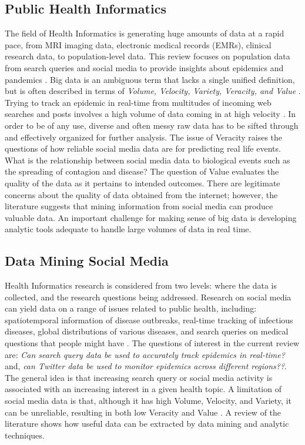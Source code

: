 \documentclass[sigconf]{acmart}
\begin{document}
\subsection{Public Health Informatics}

The field of Health Informatics is generating huge amounts of data at a rapid pace,
from MRI imaging data, electronic medical records (EMRs), clinical research data, to
population-level data. This review focuses on population data from search queries and 
social media to provide insights about epidemics and pandemics \cite{hay13, herland14}. 
Big data is an ambiguous term that lacks a single unified definition, but is often 
described in terms of {\it Volume, Velocity, Variety, Veracity, and Value}
\cite{demchenko12}. Trying to track an epidemic in real-time from multitudes of 
incoming web searches and posts involves a high volume of data coming in at high 
velocity \cite{lamb13, paul14}. In order to be of any use, diverse and often messy 
raw data has to be sifted through and effectively organized for further analysis. 
The issue of Veracity raises the questions of how reliable social media data are for 
predicting real life events. What is the relationship between social media data to 
biological events such as the spreading of contagion and disease? The question of 
Value evaluates the quality of the data as it pertains to intended outcomes. There 
are legitimate concerns about the quality of data obtained from the internet; 
however, the literature suggests that mining information from social media can 
produce valuable data. An important challenge for making sense of big data is 
developing analytic tools adequate to handle large volumes of data in real time.

\subsection{Data Mining Social Media}

Health Informatics research is considered from two levels: where the data is 
collected, and the research questions being addressed. Research on social media 
can yield data on a range of issues related to public health, including: 
spatiotemporal information of disease outbreaks, real-time tracking of infectious 
diseases, global distributions of various diseases, and search queries on medical 
questions that people might have \cite{herland14}. The questions of interest in the 
current review are: \textit{Can search query data be used to accurately track epidemics 
in real-time?} and, \textit{can Twitter data be used to monitor epidemics across 
different regions??}. The general idea is that increasing search query or social 
media activity is associated with an increasing interest in a given health topic. 
A limitation of social media data is that, although it has high Volume, Velocity, 
and Variety, it can be unreliable, resulting in both low Veracity and Value 
\cite{hay13, lazer14}. A review of the literature shows how useful data can be 
extracted by data mining and analytic techniques. 
\end{document}
